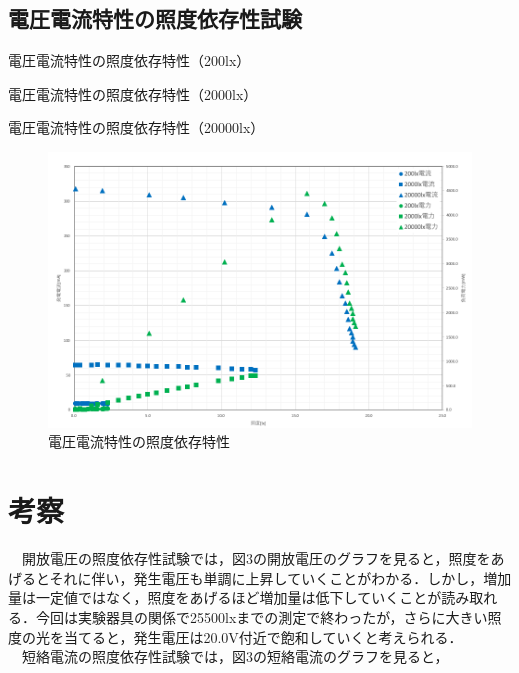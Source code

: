 \subsection{電圧電流特性の照度依存性試験}
\begin{table}[H]
  \small
  \centering
  \caption{電圧電流特性の照度依存特性（200lx）}
  
\end{table}

\begin{table}[H]
  \small
  \centering
  \caption{電圧電流特性の照度依存特性（2000lx）}
  
\end{table}

\begin{table}[H]
  \small
  \centering
  \caption{電圧電流特性の照度依存特性（20000lx）}
  
\end{table}

\begin{figure}[H]
  \centering
  \includegraphics[width=15cm]{./fig/fig05.png}
  \caption{電圧電流特性の照度依存特性}
\end{figure}

\section{考察}
　開放電圧の照度依存性試験では，図3の開放電圧のグラフを見ると，照度をあげるとそれに伴い，発生電圧も単調に上昇していくことがわかる．しかし，増加量は一定値ではなく，照度をあげるほど増加量は低下していくことが読み取れる．今回は実験器具の関係で25500lxまでの測定で終わったが，さらに大きい照度の光を当てると，発生電圧は20.0V付近で飽和していくと考えられる．\\

　短絡電流の照度依存性試験では，図3の短絡電流のグラフを見ると，

\begin{table}[htbp]
  \centering
  \caption{}
  
\end{table}%


